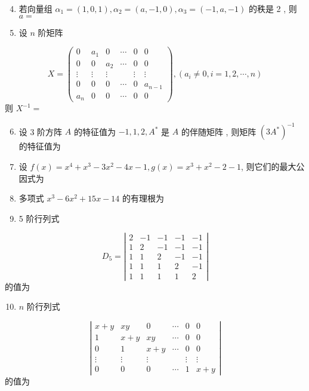 \documentclass[10pt]{article}
\begin{document}
{\begin{enumerate}
  \setcounter{enumi}{3}
  \item  若向量组  $\alpha_{1}=(1,0,1), \alpha_{2}=(a,-1,0), \alpha_{3}=(-1, a,-1)$  的秩是  2 ,  则  $a=$

  \item  设  $n$  阶矩阵 

\end{enumerate}
$$
X=\left(\begin{array}{cccccc}
0 & a_{1} & 0 & \cdots & 0 & 0 \\
0 & 0 & a_{2} & \cdots & 0 & 0 \\
\vdots & \vdots & \vdots & & \vdots & \vdots \\
0 & 0 & 0 & \cdots & 0 & a_{n-1} \\
a_{n} & 0 & 0 & \cdots & 0 & 0
\end{array}\right),\left(a_{i} \neq 0, i=1,2, \cdots, n\right)
$$
 则  $X^{-1}=$

\begin{enumerate}
  \setcounter{enumi}{5}
  \item  设  3  阶方阵  $A$  的特征值为  $-1,1,2, A^{*}$  是  $A$  的伴随矩阵 ,  则矩阵  $\left(3 A^{*}\right)^{-1}$  的特征值为 

  \item  设  $f(x)=x^{4}+x^{3}-3 x^{2}-4 x-1, g(x)=x^{3}+x^{2}-2-1$,  则它们的最大公因式为 

  \item  多项式  $x^{3}-6 x^{2}+15 x-14$  的有理根为 

  \item 5  阶行列式 

\end{enumerate}
$$
D_{5}=\left|\begin{array}{ccccc}
2 & -1 & -1 & -1 & -1 \\
1 & 2 & -1 & -1 & -1 \\
1 & 1 & 2 & -1 & -1 \\
1 & 1 & 1 & 2 & -1 \\
1 & 1 & 1 & 1 & 2
\end{array}\right|
$$
 的值为 

\begin{enumerate}
  \setcounter{enumi}{9}
  \item $n$  阶行列式 
\end{enumerate}
$$
\left|\begin{array}{cccccc}
x+y & x y & 0 & \cdots & 0 & 0 \\
1 & x+y & x y & \cdots & 0 & 0 \\
0 & 1 & x+y & \cdots & 0 & 0 \\
\vdots & \vdots & \vdots & & \vdots & \vdots \\
0 & 0 & 0 & \cdots & 1 & x+y
\end{array}\right|
$$
 的值为 

}
\end{document}

